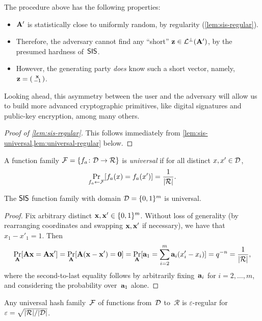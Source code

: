 \documentclass[11pt]{article}
\newcommand{\calR}{\ensuremath{\mathcal{R}}}
\begin{document}
The procedure above has the following properties:
\begin{itemize}[itemsep=0pt]
\item $\mathbf{A}'$ is statistically close to uniformly random, by
  regularity (\cref{lem:sis-regular}).
\item Therefore, the adversary cannot find any ``short''
  $\mathbf{z} \in \mathcal{L}^{\perp}(\mathbf{A}')$, by the presumed hardness of~$\mathsf{SIS}$.
\item However, the generating party \emph{does} know such a short
  vector, namely, $\mathbf{z} = \left(\begin{smallmatrix}\mathbf{x} \\ -1\end{smallmatrix}\right)$.
\end{itemize}
Looking ahead, this asymmetry between the user and the adversary will
allow us to build more advanced cryptographic primitives, like digital
signatures and public-key encryption, among many others.

\begin{proof}[Proof of \cref{lem:sis-regular}]
  This follows immediately from
  \cref{lem:sis-universal,lem:universal-regular} below.
\end{proof}

\begin{definition}
  \label{def:universal}
  A function family $\calF = \set{f_{a} \colon \calD \to \calR}$ is
  \emph{universal} if for all distinct $x, x' \in \mathcal{D}$,
  \[ \Pr_{f_a \gets \calF}[f_a(x)=f_a(x')] = \frac{1}{\abs{\calR}}
    . \]
\end{definition}

\begin{lemma}
  \label{lem:sis-universal}
  The $\mathsf{SIS}$ function family with domain $\mathcal{D}=\{0,1\}^{m}$ is
  universal.
\end{lemma}

\begin{proof}
  Fix arbitrary distinct $\mathbf{x}, \mathbf{x}' \in \{0,1\}^{m}$. Without loss of
  generality (by rearranging coordinates and swapping $\mathbf{x},\mathbf{x}'$
  if necessary), we have that $x_1-x'_1 = 1$. Then
  \[ \Pr_{\matA}[\matA\vecx = \matA\vecx'] =
    \Pr_{\matA}[\matA(\vecx-\vecx') = \veczero] = \Pr_{\matA}[\veca_1
    = \sum_{i=2}^{m} \veca_{i} (x'_{i}-x_{i})] = q^{-n} =
    \frac{1}{\abs{\calR}} ,
  \]
  where the second-to-last equality follows by arbitrarily
  fixing~$\mathbf{a}_{i}$ for $i=2,\ldots,m$, and considering the
  probability over~$\mathbf{a}_{1}$ alone.
\end{proof}

\begin{lemma}
  \label{lem:universal-regular}
  Any universal hash family~$\mathcal{F}$ of functions from~$\mathcal{D}$
  to~$\calR$ is $\varepsilon$-regular for
  $\varepsilon=\sqrt{\abs{\calR}/{\abs{\calD}}}$.
\end{lemma}
\end{document}

